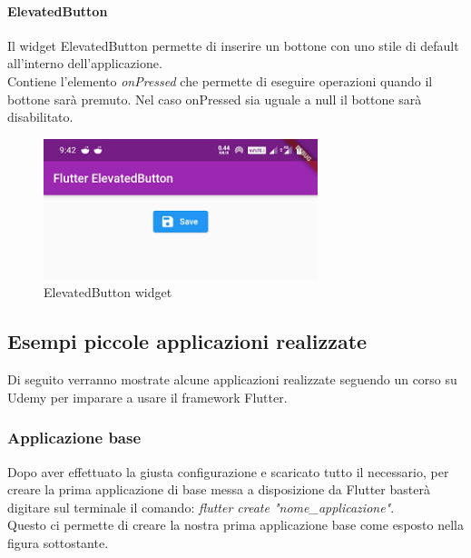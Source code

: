 \paragraph{ElevatedButton}
Il widget ElevatedButton permette di inserire un bottone con uno stile di default all'interno dell'applicazione.\\
Contiene l'elemento \textit{onPressed} che permette di eseguire operazioni quando il bottone sarà premuto. Nel caso onPressed sia uguale a null il bottone sarà disabilitato.
\begin{figure}[htbp]	
	\centering
	\includegraphics[width=8cm]{immagini/button.png}
	\caption{ElevatedButton widget}
	\label{fig:ElevatedButton widget}
\end{figure}

\newpage

\subsection{Esempi piccole applicazioni realizzate}
Di seguito verranno mostrate alcune applicazioni realizzate seguendo un corso su Udemy per imparare a usare il framework Flutter.

\subsubsection{Applicazione base}
Dopo aver effettuato la giusta configurazione e scaricato tutto il necessario, per creare la prima applicazione di base messa a disposizione da Flutter basterà digitare sul terminale il comando: \textit{flutter create "nome\_applicazione"}.\\
Questo ci permette di creare la nostra prima applicazione base come esposto nella figura sottostante.\\

